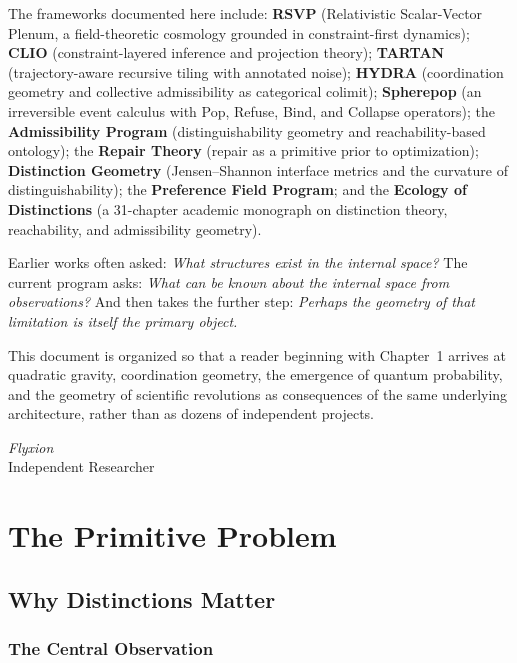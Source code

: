 \documentclass[12pt,a4paper]{book}
\theoremstyle{remark}
\theoremstyle{definition}
\begin{document}
The frameworks documented here include: \textbf{RSVP} (Relativistic
Scalar-Vector Plenum, a field-theoretic cosmology grounded in
constraint-first dynamics); \textbf{CLIO} (constraint-layered
inference and projection theory); \textbf{TARTAN} (trajectory-aware
recursive tiling with annotated noise); \textbf{HYDRA} (coordination
geometry and collective admissibility as categorical colimit);
\textbf{Spherepop} (an irreversible event calculus with Pop, Refuse,
Bind, and Collapse operators); the \textbf{Admissibility Program}
(distinguishability geometry and reachability-based ontology); the
\textbf{Repair Theory} (repair as a primitive prior to optimization);
\textbf{Distinction Geometry} (Jensen--Shannon interface metrics and
the curvature of distinguishability); the \textbf{Preference Field
Program}; and the \textbf{Ecology of Distinctions} (a 31-chapter
academic monograph on distinction theory, reachability, and
admissibility geometry).

Earlier works often asked: \textit{What structures exist in the internal
space?} The current program asks: \textit{What can be known about the
internal space from observations?} And then takes the further step:
\textit{Perhaps the geometry of that limitation is itself the primary
object.}

This document is organized so that a reader beginning with Chapter~1
arrives at quadratic gravity, coordination geometry, the emergence of
quantum probability, and the geometry of scientific revolutions as
consequences of the same underlying architecture, rather than as dozens
of independent projects.

\bigskip\noindent
\textit{Flyxion}\\
Independent Researcher

\mainmatter

\part{The Primitive Problem}

\chapter{Why Distinctions Matter}

\section{The Central Observation}
\end{document}
